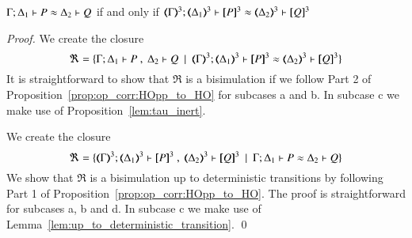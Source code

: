 \begin{proposition}\rm
	$\Gamma; \Delta_1 \vdash P \approx \Delta_2 \vdash Q$ if and only if $\horel{\tmap{\Gamma}{3}}{\tmap{\Delta_1}{3}}{\pmap{P}{3}}{\wb}{\tmap{\Delta_2}{3}}{\pmap{Q}{3}}$
\end{proposition}

\begin{proof}

	\noi We create the closure
%
	\[
		\Re = \set{\horel{\Gamma}{\Delta_1}{P}{\ ,\ }{\Delta_2}{Q} \setbar \horel{\tmap{\Gamma}{3}}{\tmap{\Delta_1}{3}}{\pmap{P}{3}}{\wb}{\tmap{\Delta_2}{3}}{\pmap{Q}{3}}}
	\]
%
	\noi	It is straightforward to show that $\Re$ is a bisimulation if we follow Part 2 of
		Proposition~\ref{prop:op_corr:HOpp_to_HO} for subcases a and b.
		In subcase c we make use of Proposition~\ref{lem:tau_inert}.


	\noi We create the closure
%
	\[
		\Re = \set{\horel{\tmap{\Gamma}{3}}{\tmap{\Delta_1}{3}}{\pmap{P}{3}}{\ ,\ }{\tmap{\Delta_2}{3}}{\pmap{Q}{3}} \setbar \horel{\Gamma}{\Delta_1}{P}{\wb}{\Delta_2}{Q}}
	\]
%
	\noi	We show that $\Re$ is a bisimulation up to deterministic transitions
		by following Part 1 of Proposition~\ref{prop:op_corr:HOpp_to_HO}.
		The proof is straightforward for subcases a, b and d.
		In subcase c we make use of Lemma~\ref{lem:up_to_deterministic_transition}.
	\qed
\end{proof}
